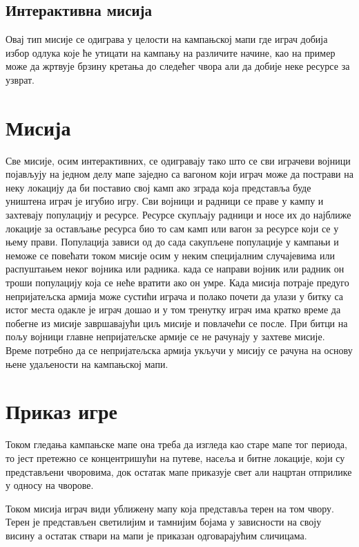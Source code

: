\documentclass[11pt,a4paper]{report}
\begin{document}
\subsection{Интерактивна мисија}
Овај тип мисије се одиграва у целости на кампањској мапи где играч добија избор одлука које ће утицати на кампању на различите начине, као на пример може да жртвује брзину кретања до следећег чвора али да добије неке ресурсе за узврат.

\section{Мисија}
Све мисије, осим интерактивних, се одигравају тако што се сви играчеви војници појављују на једном делу мапе заједно са вагоном који играч може да пострави на неку локацију да би поставио свој камп ако зграда која представља буде уништена играч је игубио игру. Сви војници и радници се праве у кампу и захтевају популацију и ресурсе. Ресурсе скупљају радници и носе их до најближе локације за остављање ресурса  био то сам камп или вагон за ресурсе који се у њему прави. Популација зависи од до сада сакупљене популације  у кампањи и неможе се повећати током мисије осим у неким специјалним случајевима или распуштањем неког војника или радника. када се направи војник или радник он троши популацију која се неће вратити ако он умре. Када мисија потраје предуго непријатељска армија може сустићи играча и полако почети да улази у битку са истог места одакле је играч дошао и у том тренутку играч има кратко време да побегне из мисије завршавајући циљ мисије и повлачећи се после. При битци на пољу војници главне непријатељске армије се не рачунају у захтеве мисије. Време потребно да се непријатељска армија укључи у мисију се рачуна на основу њене удаљености на кампањској мапи.

\section{Приказ игре}
Током гледања кампањске мапе она треба да изгледа као старе мапе тог периода, то јест претежно се концентришући на путеве, насеља и битне локације, који су представљени чворовима, док остатак мапе приказује свет али нацртан отприлике у односу на чворове.

Током мисија играч види уближену мапу која представља терен на том чвору. Терен је представљен светилијим и тамнијим бојама у зависности на своју висину а остатак ствари на мапи је приказан одговарајућим сличицама. 
\end{document}

